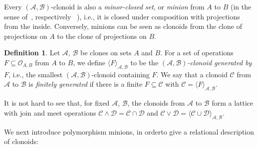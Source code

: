\documentclass[11pt]{amsart}
\theoremstyle{plain}
\theoremstyle{definition}
\newtheorem{definition}[thm]{Definition}
\newcommand{\clone}[1]{\mathcal{#1}}
\newcommand{\clonoid}[1]{\mathcal{#1}}
\newcommand{\clodC}{\clonoid{C}}
\newcommand{\clodD}{\clonoid{D}}
\newcommand{\clodO}{\clonoid{O}}
\newcommand{\cloA}{\clone{A}}
\newcommand{\cloB}{\clone{B}}
\begin{document}
Every $(\cloA,\cloB)$-clonoid is also a \emph{minor-closed set}, or \emph{minion} from $A$ to $B$ (in the sense of~\cite{pippenger-minions}, respectively ~\cite{BBKO-PCSP}), i.e., it is closed under composition with projections from the inside. Conversely, minions can be seen as clonoids from the clone of projections on $A$ to the clone of projections on $B$.


\begin{definition}
Let $\cloA$, $\cloB$ be clones on sets $A$ and $B$. For a set of operations $F \subseteq \clodO_{A,B}$ from $A$ to $B$, we define $\langle F \rangle_{\cloA,\cloB}$ to be the \emph{$(\cloA,\cloB)$-clonoid generated by $F$}, i.e., the smallest $(\cloA,\cloB)$-clonoid containing $F$. 
We say that a clonoid $\clodC$ from $\cloA$ to $\cloB$ is \emph{finitely generated} if there is a finite $F \subseteq \clodC$ with $\clodC = \langle F \rangle_{\cloA,\cloB}$.
\end{definition}

It is not hard to see that, for fixed $\cloA$, $\cloB$, the clonoids from $\cloA$ to $\cloB$ form a lattice with join and meet operations $\clodC \land \clodD = \clodC \cap \clodD$ and $\clodC \lor \clodD = \langle \clodC \cup \clodD \rangle_{\cloA,\cloB}$.

We next introduce polymorphism minions, in orderto give a relational description of clonoids:

\end{document}
